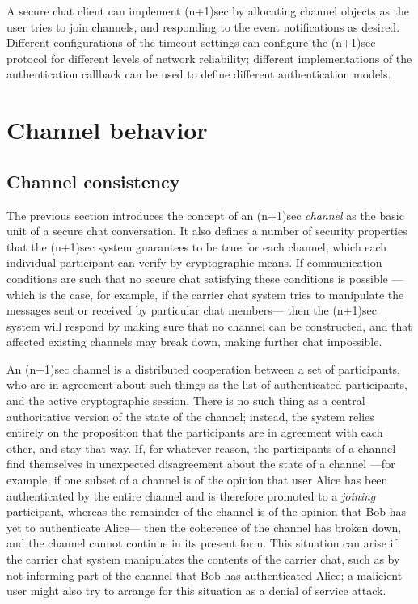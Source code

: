 \documentclass{article}
\begin{document}
A secure chat client can implement (n+1)sec by allocating channel objects as the user tries to join channels, and responding to the event notifications as desired.
Different configurations of the timeout settings can configure the (n+1)sec protocol for different levels of network reliability; different implementations of the authentication callback can be used to define different authentication models.

\section{Channel behavior}
\label{sec:channel-behavior}

\subsection{Channel consistency}
\label{sec:channel-behavior/channel-consistency}
The previous section introduces the concept of an (n+1)sec \emph{channel} as the basic unit of a secure chat conversation.
It also defines a number of security properties that the (n+1)sec system guarantees to be true for each channel, which each individual participant can verify by cryptographic means.
If communication conditions are such that no secure chat satisfying these conditions is possible ---which is the case, for example, if the carrier chat system tries to manipulate the messages sent or received by particular chat members--- then the (n+1)sec system will respond by making sure that no channel can be constructed, and that affected existing channels may break down, making further chat impossible.

An (n+1)sec channel is a distributed cooperation between a set of participants, who are in agreement about such things as the list of authenticated participants, and the active cryptographic session.
There is no such thing as a central authoritative version of the state of the channel; instead, the system relies entirely on the proposition that the participants are in agreement with each other, and stay that way.
If, for whatever reason, the participants of a channel find themselves in unexpected disagreement about the state of a channel ---for example, if one subset of a channel is of the opinion that user Alice has been authenticated by the entire channel and is therefore promoted to a \emph{joining} participant, whereas the remainder of the channel is of the opinion that Bob has yet to authenticate Alice--- then the coherence of the channel has broken down, and the channel cannot continue in its present form.
This situation can arise if the carrier chat system manipulates the contents of the carrier chat, such as by not informing part of the channel that Bob has authenticated Alice; a malicient user might also try to arrange for this situation as a denial of service attack.
\end{document}
